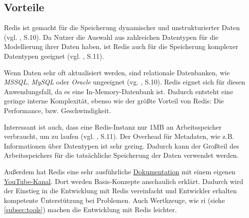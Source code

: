 
\subsection{Vorteile}

\ac{Redis} ist gemacht für die Speicherung dynamischer und unstrukturierter Daten (vgl. \cite{4}, S.10). Da Nutzer die Auswahl aus zahlreichen Datentypen für die Modellierung ihrer Daten haben, ist \ac{Redis} auch für die Speicherung komplexer Datentypen geeignet (vgl. \cite{4}, S.11).

Wenn Daten sehr oft aktualisiert werden, sind relationale Datenbanken, wie \textit{MSSQL}, \textit{MySQL} oder \textit{Oracle} ungeeignet (vg. \cite{4}, S.10). Redis eignet sich für diesen Anwendungsfall, da es eine In-Memory-Datenbank ist. Dadurch entsteht eine geringe interne Komplexität, ebenso wie der größte Vorteil von \ac{Redis}: Die Performance, bzw. Geschwindigkeit.

Interessant ist auch, dass eine \ac{Redis}-Instanz nur 1MB an Arbeitsspeicher verbraucht, um zu laufen (vgl. \cite{4}, S.11). Der Overhead für Metadaten, wie z.B. Informationen über Datentypen ist sehr gering. Dadurch kann der Großteil des Arbeitsspeichers für die tatsächliche Speicherung der Daten verwendet werden.

Außerdem hat \ac{Redis} eine sehr ausführliche \href{https://redis.io/docs/}{Dokumentation} mit einem eigenen \href{https://www.youtube.com/@Redisinc}{YouTube-Kanal}. Dort werden Basis-Konzepte anschaulich erklärt. Dadurch wird der Einstieg in die Entwicklung mit \ac{Redis} vereinfacht und Entwickler erhalten kompetente Ünterstützung bei Problemen. Auch Wertkzeuge, wie \gls{ri} (siehe \autoref{subsec:tools}) machen die Entwicklung mit \ac{Redis} leichter.
